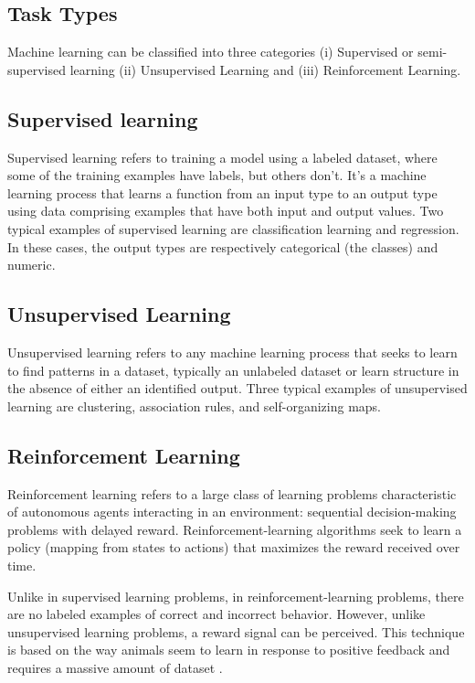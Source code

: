 \subsection{Task Types}

Machine learning can be classified into three categories (i) Supervised or semi-supervised learning (ii) Unsupervised Learning and (iii) Reinforcement Learning.

\subsection*{Supervised learning}

Supervised learning \cite{sammut2011encyclopedia} refers to training a model using a labeled dataset, where some of the training examples have labels, but others don’t. It's a machine learning process that learns a function from an input type to an output type using data comprising examples that have both input and output values. Two typical examples of supervised learning are classification learning and regression. In these cases, the output types are respectively categorical (the classes) and numeric. 

\subsection*{Unsupervised Learning}

Unsupervised learning \cite{sammut2011encyclopedia} refers to any machine learning process that seeks to learn to find patterns in a dataset, typically an unlabeled dataset or learn structure in the absence of either an identified output. Three typical examples of unsupervised learning are clustering,  association rules, and self-organizing maps.

\subsection*{Reinforcement Learning}

Reinforcement learning \cite{sammut2011encyclopedia} refers to a large class of learning problems characteristic of autonomous agents interacting in an environment: sequential decision-making problems with delayed reward. Reinforcement-learning algorithms seek to learn a policy (mapping from states to actions) that maximizes the reward received over time.

Unlike in supervised learning problems, in reinforcement-learning problems, there are no labeled examples of correct and incorrect behavior. However, unlike unsupervised learning problems, a reward signal can be perceived. This technique is based on the way animals seem to learn in response to positive feedback and requires a massive amount of dataset \cite{sammut2011encyclopedia}.

